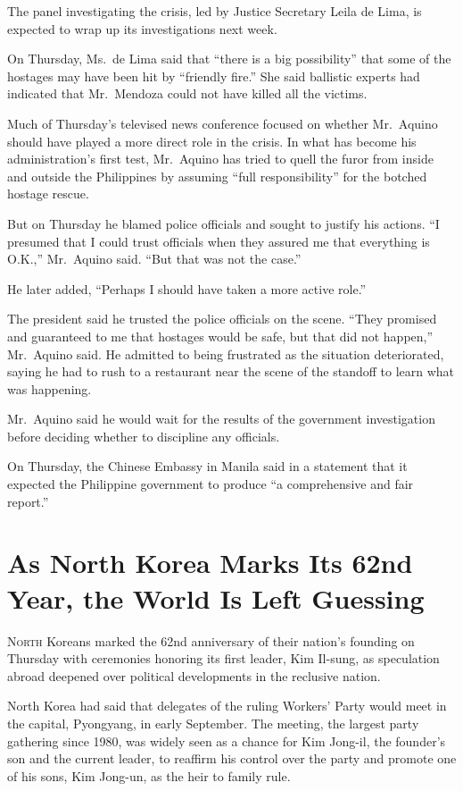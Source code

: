 ﻿\documentclass[12pt]{article}
\begin{document}
The panel investigating the crisis, led by Justice Secretary Leila de Lima, is expected to wrap up
its investigations next week.

On Thursday, Ms.~de Lima said that ``there is a big possibility'' that some of the hostages may have
been hit by ``friendly fire.'' She said ballistic experts had indicated that Mr.~Mendoza could not
have killed all the victims.

Much of Thursday's televised news conference focused on whether Mr.~Aquino should have played a more
direct role in the crisis. In what has become his administration's first test, Mr.~Aquino has tried
to quell the furor from inside and outside the Philippines by assuming ``full responsibility'' for
the botched hostage rescue.

But on Thursday he blamed police officials and sought to justify his actions. ``I presumed that I
could trust officials when they assured me that everything is O.K.,'' Mr.~Aquino said. ``But that
was not the case.''

He later added, ``Perhaps I should have taken a more active role.''

The president said he trusted the police officials on the scene. ``They promised and guaranteed to
me that hostages would be safe, but that did not happen,'' Mr.~Aquino said. He admitted to being
frustrated as the situation deteriorated, saying he had to rush to a restaurant near the scene of
the standoff to learn what was happening.

Mr.~Aquino said he would wait for the results of the government investigation before deciding
whether to discipline any officials.

On Thursday, the Chinese Embassy in Manila said in a statement that it expected the Philippine
government to produce ``a comprehensive and fair report.''

\pagebreak
\section{As North Korea Marks Its 62nd Year, the World Is Left Guessing}

\lettrine{N}{orth} Koreans marked the 62nd anniversary of their nation's
founding on Thursday with ceremonies honoring its first leader, Kim Il-sung, as speculation abroad
deepened over political developments in the reclusive nation.

North Korea had said that delegates of the ruling Workers' Party would meet in the capital,
Pyongyang, in early September. The meeting, the largest party gathering since 1980, was widely seen
as a chance for Kim Jong-il, the founder's son and the current leader, to reaffirm his control over
the party and promote one of his sons, Kim Jong-un, as the heir to family rule.
\end{document}
